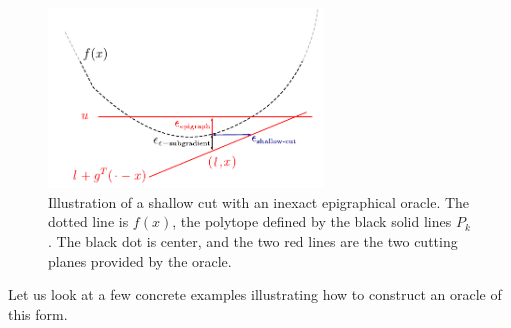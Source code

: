 \begin{figure} 
\begin{centering}
\includegraphics[width=0.65\textwidth]{cutting/fig0.pdf}
\par\end{centering}
\caption{Illustration of a shallow cut with an inexact epigraphical oracle. The dotted
line is $f(x)$, the polytope defined by the black solid lines $P_k$. The black
dot is center, and the two red lines are the two cutting planes provided by the 
oracle.} \label{fig:approx-oracle}
\end{figure}

Let us look at a few concrete examples illustrating how to construct an oracle of this form.

